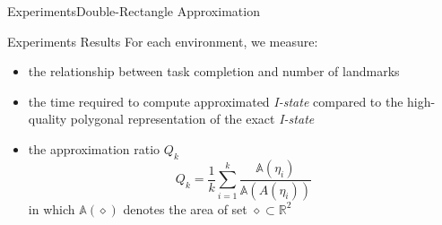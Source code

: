 \begin{frame}{Experiments}{Double-Rectangle Approximation}
  \begin{center}
  \end{center}
\end{frame} 

\begin{frame}{Experiments Results}
For each environment, we measure:
\begin{itemize}
\item the relationship between task completion and number of landmarks
\item the time required to compute approximated \emph{I-state} compared to the
  high-quality polygonal representation of the exact \emph{I-state}
\item the approximation ratio $Q_k$
  \begin{equation}
    Q_k = \frac{1}{k} \sum_{i=1}^k \frac{\mathbb{A}(\eta_i)}{\mathbb{A}(A(\eta_i))}
  \end{equation}
  in which $\mathbb{A}(\diamond)$ denotes the area of set $\diamond \subset \mathbb{R}^2$
\end{itemize}
\end{frame}

